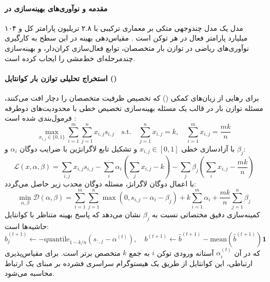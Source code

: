 \item {}

\paragraph*{مقدمه و نوآوری‌های بهینه‌سازی در }
مدل  یک مدل چندوجهی متکی بر معماری ترکیبی با ۲.۸ تریلیون پارامتر کل و ۱۰۴ میلیارد پارامتر فعال در هر توکن است \cite{kimi2026k3}. مقیاس‌دهی بهینه در این سطح به کارگیری نوآوری‌های ریاضی در توازن بار متخصصان، توابع فعال‌سازی کران‌دار، و بهینه‌سازی چندمرحله‌ای خط‌مشی را ایجاب کرده است.

\paragraph*{استخراج تحلیلی توازن بار کوانتایل ()}
برای رهایی از زیان‌های کمکی () که تخصیص ظرفیت متخصصان را دچار افت می‌کنند، مسئله توازن بار در قالب یک مسئله بهینه‌سازی تخصیص خطی با محدودیت‌های دوطرفه فرمول‌بندی شده است \cite{kimi2026k3, su2026moe}:
\begin{equation}
    \max_{x_{i,j} \in \{0, 1\}} \sum_{i=1}^m \sum_{j=1}^n x_{i,j} s_{i,j} \quad \text{s.t.} \quad \sum_{j=1}^n x_{i,j} = k, \quad \sum_{i=1}^m x_{i,j} = \frac{mk}{n}
\end{equation}
با آزادسازی خطی $x_{i,j} \in [0, 1]$ و تشکیل تابع لاگرانژین با ضرایب دوگان $\alpha_i$ و $\beta_j$:
\begin{equation}
    \mathcal{L}(x, \alpha, \beta) = \sum_{i,j} x_{i,j} s_{i,j} - \sum_{i} \alpha_i \left(\sum_j x_{i,j} - k\right) - \sum_j \beta_j \left(\sum_i x_{i,j} - \frac{mk}{n}\right)
\end{equation}
با اعمال دوگان لاگرانژ، مسئله دوگان محدب زیر حاصل می‌گردد:
\begin{equation}
    \min_{\alpha, \beta} \mathcal{D}(\alpha, \beta) = \sum_{i=1}^m \sum_{j=1}^n \max(0, s_{i,j} - \alpha_i - \beta_j) + k \sum_{i=1}^m \alpha_i + \frac{mk}{n} \sum_{j=1}^n \beta_j
\end{equation}
کمینه‌سازی دقیق مختصاتی نسبت به $\beta_j$ نشان می‌دهد که پاسخ بهینه متناظر با کوانتایل حاشیه‌ها است:
\begin{equation}
    \hat{b}_j^{(t+1)} \leftarrow -\text{quantile}_{1 - k/n} \left(s_{:, j} - \alpha^{(t)}\right), \quad b^{(t+1)} \leftarrow \hat{b}^{(t+1)} - \text{mean}\left(\hat{b}^{(t+1)}\right) \mathbf{1}
\end{equation}
که در آن $\alpha_i^{(t)}$ آستانه ورودی توکن $i$ به جمع $k$ متخصص برتر است. برای مقیاس‌پذیری ارتباطی، این کوانتایل از طریق یک هیستوگرام سراسری فشرده بر مبنای یک ارتباط  محاسبه می‌شود.

